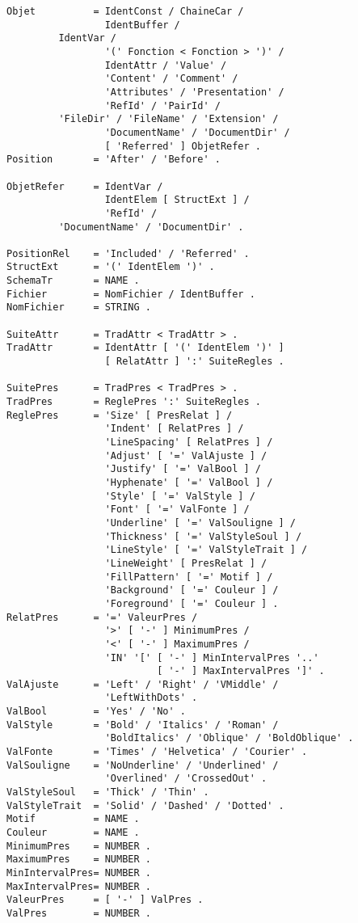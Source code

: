 {\begin{verbatim}
Objet          = IdentConst / ChaineCar /
                 IdentBuffer /
		 IdentVar /
                 '(' Fonction < Fonction > ')' /
                 IdentAttr / 'Value' /
                 'Content' / 'Comment' / 
                 'Attributes' / 'Presentation' /
                 'RefId' / 'PairId' /
		 'FileDir' / 'FileName' / 'Extension' /
                 'DocumentName' / 'DocumentDir' /
                 [ 'Referred' ] ObjetRefer .
Position       = 'After' / 'Before' .

ObjetRefer     = IdentVar /
                 IdentElem [ StructExt ] /
                 'RefId' /
		 'DocumentName' / 'DocumentDir' .

PositionRel    = 'Included' / 'Referred' .
StructExt      = '(' IdentElem ')' .
SchemaTr       = NAME .
Fichier        = NomFichier / IdentBuffer .
NomFichier     = STRING .

SuiteAttr      = TradAttr < TradAttr > .
TradAttr       = IdentAttr [ '(' IdentElem ')' ] 
                 [ RelatAttr ] ':' SuiteRegles .

SuitePres      = TradPres < TradPres > .
TradPres       = ReglePres ':' SuiteRegles .
ReglePres      = 'Size' [ PresRelat ] /
                 'Indent' [ RelatPres ] /
                 'LineSpacing' [ RelatPres ] /
                 'Adjust' [ '=' ValAjuste ] /
                 'Justify' [ '=' ValBool ] /
                 'Hyphenate' [ '=' ValBool ] /
                 'Style' [ '=' ValStyle ] /
                 'Font' [ '=' ValFonte ] /
                 'Underline' [ '=' ValSouligne ] /
                 'Thickness' [ '=' ValStyleSoul ] /
                 'LineStyle' [ '=' ValStyleTrait ] /
                 'LineWeight' [ PresRelat ] /
                 'FillPattern' [ '=' Motif ] /
                 'Background' [ '=' Couleur ] /
                 'Foreground' [ '=' Couleur ] .
RelatPres      = '=' ValeurPres /
                 '>' [ '-' ] MinimumPres /
                 '<' [ '-' ] MaximumPres /
                 'IN' '[' [ '-' ] MinIntervalPres '..'
                          [ '-' ] MaxIntervalPres ']' .
ValAjuste      = 'Left' / 'Right' / 'VMiddle' /
                 'LeftWithDots' .
ValBool        = 'Yes' / 'No' .
ValStyle       = 'Bold' / 'Italics' / 'Roman' /
                 'BoldItalics' / 'Oblique' / 'BoldOblique' .
ValFonte       = 'Times' / 'Helvetica' / 'Courier' .
ValSouligne    = 'NoUnderline' / 'Underlined' /
                 'Overlined' / 'CrossedOut' .
ValStyleSoul   = 'Thick' / 'Thin' .
ValStyleTrait  = 'Solid' / 'Dashed' / 'Dotted' .
Motif          = NAME .
Couleur        = NAME .
MinimumPres    = NUMBER .
MaximumPres    = NUMBER .
MinIntervalPres= NUMBER .
MaxIntervalPres= NUMBER .
ValeurPres     = [ '-' ] ValPres .
ValPres        = NUMBER .


\end{verbatim}}
